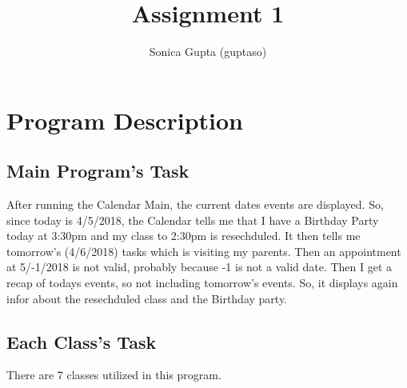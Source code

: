 \documentclass[12pt]{article}
\title{Assignment 1}
\author{Sonica Gupta (guptaso) }
\begin{document}
\maketitle 
\tableofcontents

\section{Program Description}

\subsection{Main Program's Task}
After running the Calendar Main, the current dates events are displayed. So, since today is 4/5/2018, the Calendar tells me that I have a Birthday Party today at 3:30pm and my class to 2:30pm is resechduled. It then tells me tomorrow's (4/6/2018) tasks which is visiting my parents. Then an appointment at 5/-1/2018 is not valid, probably because -1 is not a valid date. Then I get a recap of todays events, so not including tomorrow's events. So, it displays again infor about the resechduled class and the Birthday party. 


\subsection{Each Class's Task}
There are 7 classes utilized in this program.
\end{document}
